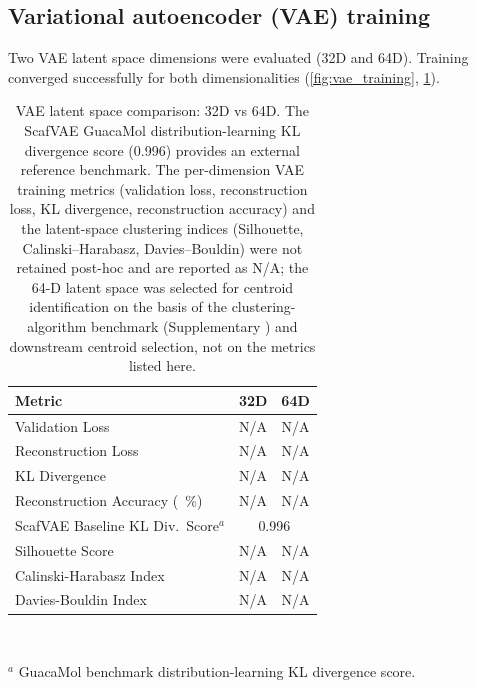 \documentclass[journal=jcisd8,manuscript=suppinfo]{achemso}
\begin{document}
\subsection*{Variational autoencoder (VAE) training}

Two VAE latent space dimensions were evaluated (32D and 64D). Training converged successfully for both dimensionalities (\cref{fig:vae_training},
\cref{tab:vae_comparison}).

\begin{table}[!htbp]
\centering  \caption{VAE latent space comparison: 32D vs 64D. The ScafVAE GuacaMol distribution-learning KL divergence score (\num{0.996}) provides an external
reference benchmark. The per-dimension VAE training metrics (validation loss, reconstruction loss, KL divergence, reconstruction accuracy) and the latent-space
clustering indices (Silhouette, Calinski--Harabasz, Davies--Bouldin) were not retained post-hoc and are reported as N/A; the \num{64}-D latent space was
selected for centroid identification on the basis of the clustering-algorithm benchmark (Supplementary ) and downstream centroid
selection, not on the metrics listed here.}
\label{tab:vae_comparison}
\small
\begin{tabular}{lcc}
\toprule
\textbf{Metric} & \textbf{32D} & \textbf{64D} \\
\midrule
Validation Loss & N/A & N/A \\
Reconstruction Loss & N/A & N/A \\
KL Divergence & N/A & N/A \\
Reconstruction Accuracy (\qty{}{\percent}) & N/A & N/A \\
ScafVAE Baseline KL Div.\ Score$^a$ \cite{tiejundong2023scafvae} & \multicolumn{2}{c}{\num{0.996}} \\
\midrule
Silhouette Score & N/A & N/A \\
Calinski-Harabasz Index & N/A & N/A \\
Davies-Bouldin Index & N/A & N/A \\
\bottomrule
\end{tabular}
\vspace{0.3em}\\
\begin{footnotesize}
$^a$ GuacaMol benchmark distribution-learning KL divergence score.
\end{footnotesize}
\end{table}
\end{document}
